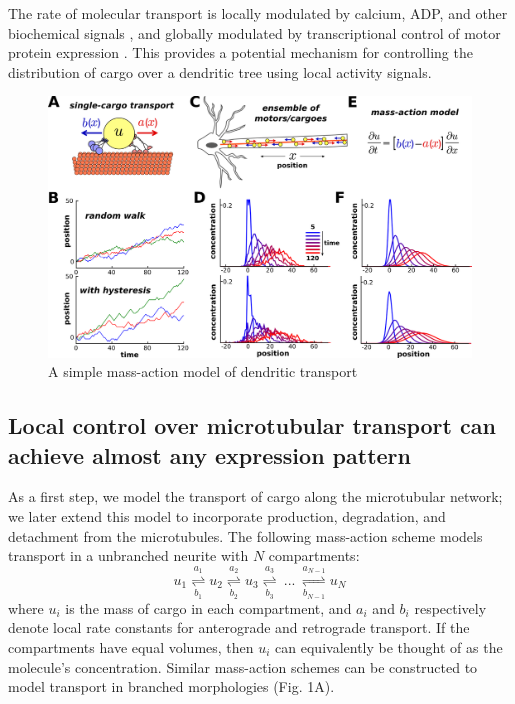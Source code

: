 \documentclass[fleqn,10pt]{wlpeerj}
\begin{document}
The rate of molecular transport is locally modulated by calcium, ADP, and other biochemical signals \citep{Wang_2009,Mironov_2007}, and globally modulated by transcriptional control of motor protein expression \citep{Puthanveettil_2008}. This provides a potential mechanism for controlling the distribution of cargo over a dendritic tree using local activity signals.

\begin{figure}[h!]
\begin{center}
\includegraphics[width=1\columnwidth]{00_stochastic.png}
\caption{A simple mass-action model of dendritic transport}
\end{center}
\end{figure}

\subsection*{Local control over microtubular transport can achieve almost any expression pattern}

As a first step, we model the transport of cargo along the microtubular network; we later extend this model to incorporate production, degradation, and detachment from the microtubules. The following mass-action scheme models transport in a unbranched neurite with $N$ compartments:
$$
u_1 \underset{b_1}{\overset{a_1}{\rightleftharpoons}} u_2 \underset{b_2}{\overset{a_2}{\rightleftharpoons}} u_3 \underset{b_3}{\overset{a_3}{\rightleftharpoons}}~...~\underset{b_{N-1}}{\overset{a_{N-1}}{\rightleftharpoons}}  u_N
$$
where $u_i$ is the mass of cargo in each compartment, and $a_i$ and $b_i$ respectively denote local rate constants for anterograde and retrograde transport. If the compartments have equal volumes, then $u_i$ can equivalently be thought of as the molecule's concentration. Similar mass-action schemes can be constructed to model transport in branched morphologies (Fig. 1A).
\end{document}
